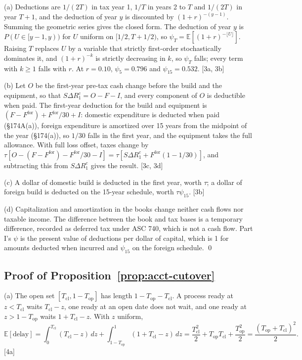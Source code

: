 (a) Deductions are $1/(2T)$ in tax year 1, $1/T$ in years 2 to $T$ and $1/(2T)$ in year $T+1$, and the deduction of year $y$ is discounted by $(1+r)^{-(y-1)}$. Summing the geometric series gives the closed form. The deduction of year $y$ is $P(U\in[y-1,y))$ for $U$ uniform on $[1/2,T+1/2)$, so $\psi_T=\mathbb E[(1+r)^{-\lfloor U\rfloor}]$. Raising $T$ replaces $U$ by a variable that strictly first-order stochastically dominates it, and $(1+r)^{-k}$ is strictly decreasing in $k$, so $\psi_T$ falls; every term with $k\ge1$ falls with $r$. At $r=0.10$, $\psi_5=0.796$ and $\psi_{15}=0.532$. [3a, 3b]

(b) Let $O$ be the first-year pre-tax cash change before the build and the equipment, so that $S\Delta R^c_1=O-F-I$, and every component of $O$ is deductible when paid. The first-year deduction for the build and equipment is $(F-F^{\mathrm{for}})+F^{\mathrm{for}}/30+I$: domestic expenditure is deducted when paid (\S174A(a)), foreign expenditure is amortized over 15 years from the midpoint of the year (\S174(a)), so $1/30$ falls in the first year, and the equipment takes the full allowance. With full loss offset, taxes change by $\tau[O-(F-F^{\mathrm{for}})-F^{\mathrm{for}}/30-I]=\tau[S\Delta R^c_1+F^{\mathrm{for}}(1-1/30)]$, and subtracting this from $S\Delta R^c_1$ gives the result. [3c, 3d]

(c) A dollar of domestic build is deducted in the first year, worth $\tau$; a dollar of foreign build is deducted on the 15-year schedule, worth $\tau\psi_{15}$. [3b]

(d) Capitalization and amortization in the books change neither cash flows nor taxable income. The difference between the book and tax bases is a temporary difference, recorded as deferred tax under ASC 740, which is not a cash flow. Part I's $\psi$ is the present value of deductions per dollar of capital, which is 1 for amounts deducted when incurred and $\psi_{15}$ on the foreign schedule. \qed

\subsection*{Proof of Proposition~\ref{prop:acct-cutover}}

(a) The open set $[T_{\mathrm{cl}},1-T_{\mathrm{op}}]$ has length $1-T_{\mathrm{op}}-T_{\mathrm{cl}}$. A process ready at $z<T_{\mathrm{cl}}$ waits $T_{\mathrm{cl}}-z$, one ready at an open date does not wait, and one ready at $z>1-T_{\mathrm{op}}$ waits $1+T_{\mathrm{cl}}-z$. With $z$ uniform,
\[
\mathbb E[\text{delay}]=\int_0^{T_{\mathrm{cl}}}(T_{\mathrm{cl}}-z)\,dz+\int_{1-T_{\mathrm{op}}}^1(1+T_{\mathrm{cl}}-z)\,dz=\frac{T_{\mathrm{cl}}^2}2+T_{\mathrm{op}}T_{\mathrm{cl}}+\frac{T_{\mathrm{op}}^2}2=\frac{(T_{\mathrm{op}}+T_{\mathrm{cl}})^2}2 .
\]
[4a]

